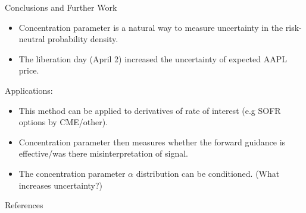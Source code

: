 \documentclass[10pt,aspectratio=43]{beamer}
\begin{document}
\begin{frame}{Conclusions and Further Work}
    \begin{itemize}
        \item Concentration parameter is a natural way to measure uncertainty in the risk-neutral probability density.
        \item The liberation day (April 2) increased the uncertainty of expected AAPL price.
    \end{itemize}

Applications:\vspace{-3ex}
\begin{itemize}
    \item This method can be applied to derivatives of rate of interest (e.g SOFR options by CME/other).
    \item Concentration parameter then measures whether the forward guidance is effective/was there misinterpretation of signal.
\end{itemize}
\begin{itemize}
    \item The concentration parameter $\alpha$ distribution can be conditioned. (What increases uncertainty?)
\end{itemize}

\end{frame}



\lastslide

\begin{frame}[allowframebreaks]{References}
    \renewcommand*{\bibfont}{\scriptsize}
    \printbibliography
\end{frame}


    
\end{document}
